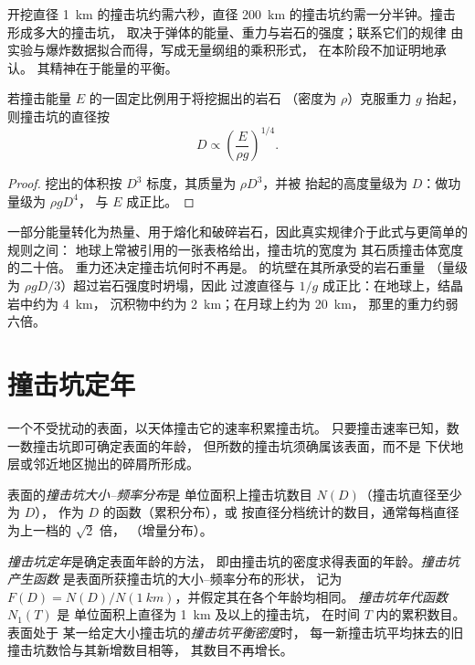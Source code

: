 开挖直径 \qty{1}{km} 的撞击坑约需六秒，直径
\qty{200}{km} 的撞击坑约需一分半钟。撞击形成多大的撞击坑，
取决于弹体的能量、重力与岩石的强度；联系它们的规律
由实验与爆炸数据拟合而得，写成无量纲组的乘积形式，
在本阶段不加证明地承认。
其精神在于能量的平衡。

\begin{proposition}[重力区的标度律]\label{prop:b3:planetary-interiors-surfaces:scaling}
若撞击能量 $E$ 的一固定比例用于将挖掘出的岩石
（密度为 $\rho$）克服重力 $g$ 抬起，则撞击坑的直径按
\[
  D \propto \left(\frac{E}{\rho g}\right)^{1/4} .
\]
\end{proposition}

\begin{proof}
挖出的体积按 $D^3$ 标度，其质量为 $\rho D^3$，并被
抬起的高度量级为 $D$：做功量级为 $\rho g D^4$，
与 $E$ 成正比。
\end{proof}

一部分能量转化为热量、用于熔化和破碎岩石，因此真实规律介于此式与更简单的规则之间：
地球上常被引用的一张表格给出，撞击坑的宽度为
其石质撞击体宽度的二十倍。
重力还决定撞击坑何时不再是。
的坑壁在其所承受的岩石重量
（量级为 $\rho g D/3$）超过岩石强度时坍塌，因此
过渡直径与 $1/g$ 成正比：在地球上，结晶岩中约为 \qty{4}{km}，
沉积物中约为 \qty{2}{km}；在月球上约为 \qty{20}{km}，
那里的重力约弱六倍。

\section{撞击坑定年}\label{sec:b3:planetary-interiors-surfaces:dating}

一个不受扰动的表面，以天体撞击它的速率积累撞击坑。
只要撞击速率已知，数一数撞击坑即可确定表面的年龄，
但所数的撞击坑须确属该表面，而不是
下伏地层或邻近地区抛出的碎屑所形成。

\begin{definition}\label{def:b3:planetary-interiors-surfaces:sfd}
表面的\emph{撞击坑大小–频率分布}是
单位面积上撞击坑数目 $N(D)$（撞击坑直径至少为 $D$），
作为 $D$ 的函数（累积分布），或
按直径分档统计的数目，通常每档直径为上一档的 $\sqrt2$ 倍，
（增量分布）。
\end{definition}

\begin{definition}\label{def:b3:planetary-interiors-surfaces:crater-dating}
\emph{撞击坑定年}是确定表面年龄的方法，
即由撞击坑的密度求得表面的年龄。\emph{撞击坑产生函数}
是表面所获撞击坑的大小–频率分布的形状，
记为 $F(D) =
N(D)/N(\qty{1}{km})$，并假定其在各个年龄均相同。
\emph{撞击坑年代函数} $N_1(T)$ 是
单位面积上直径为 \qty{1}{km} 及以上的撞击坑，
在时间 $T$ 内的累积数目。表面处于
某一给定大小撞击坑的\emph{撞击坑平衡密度}时，
每一新撞击坑平均抹去的旧撞击坑数恰与其新增数目相等，
其数目不再增长。
\end{definition}

